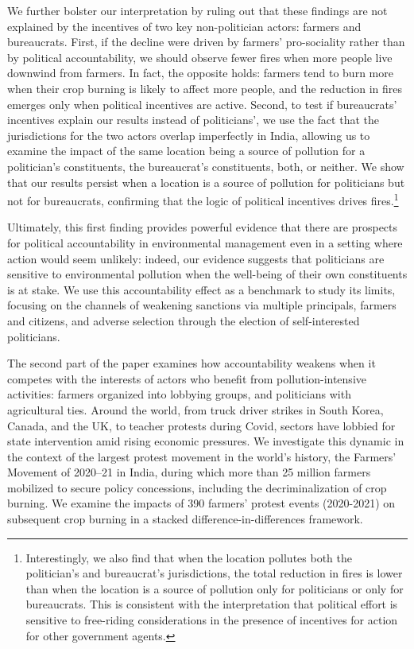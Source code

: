 \documentclass[12pt]{article}
\begin{document}
We further bolster our interpretation by ruling out that these findings are not explained by the incentives of two key non-politician actors: farmers and bureaucrats. First, if the decline were driven by farmers’ pro-sociality rather than by political accountability, we should observe fewer fires when more people live downwind from farmers. In fact, the opposite holds: farmers tend to burn more when their crop burning is likely to affect more people, and the reduction in fires emerges only when political incentives are active. Second, to test if bureaucrats' incentives explain our results instead of politicians', we use the fact that the jurisdictions for the two actors overlap imperfectly in India, allowing us to examine the impact of the same location being a source of pollution for a politician's constituents, the bureaucrat's constituents, both, or neither. We show that our results persist when a location is a source of pollution for politicians but not for bureaucrats, confirming that the logic of political incentives drives fires.\footnote{Interestingly, we also find that when the location pollutes both the politician's and bureaucrat's jurisdictions, the total reduction in fires is lower than when the location is a source of pollution only for politicians or only for bureaucrats. This is consistent with the interpretation that political effort is sensitive to free-riding considerations in the presence of incentives for action for other government agents.} 

Ultimately, this first finding provides powerful evidence that there are prospects for political accountability in environmental management even in a setting where action would seem unlikely: indeed, our evidence suggests that politicians are sensitive to environmental pollution when the well-being of their own constituents is at stake. We use this accountability effect as a benchmark to study its limits, focusing on the channels of weakening sanctions via multiple principals, farmers and citizens, and adverse selection through the election of self-interested politicians. 


The second part of the paper examines how accountability weakens when it competes with the interests of actors who benefit from pollution-intensive activities: farmers organized into lobbying groups, and politicians with agricultural ties. %
Around the world, from truck driver strikes in South Korea, Canada, and the UK, to teacher protests during Covid, sectors have lobbied for state intervention amid rising economic pressures. We investigate this dynamic in the context of the largest protest movement in the world's history, the Farmers’ Movement of 2020–21 in India, during which more than 25 million farmers mobilized to secure policy concessions, including the decriminalization of crop burning. We examine the impacts of 390 farmers' protest events (2020-2021) on subsequent crop burning in a stacked difference-in-differences framework.
\end{document}
